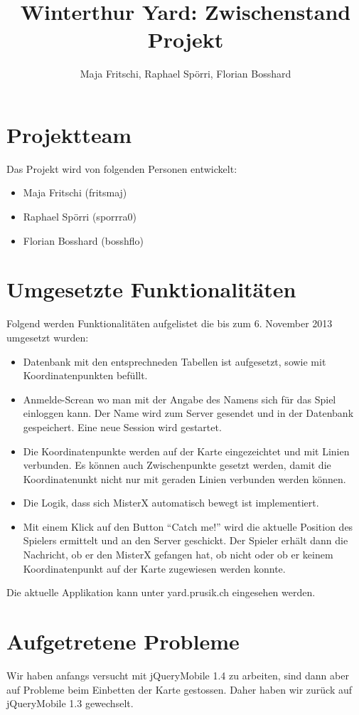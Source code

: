\documentclass[11pt]{article}
\title{Winterthur Yard: Zwischenstand Projekt}
\author{Maja Fritschi, Raphael Spörri, Florian Bosshard}
\date{}
\begin{document}
\maketitle

\tableofcontents
\newpage

\section{Projektteam}
Das Projekt wird von folgenden Personen entwickelt:
\begin{itemize}
\item Maja Fritschi (fritsmaj)
\item Raphael Spörri (sporrra0)
\item Florian Bosshard (bosshflo)
\end{itemize}


\section{Umgesetzte Funktionalitäten}
Folgend werden Funktionalitäten aufgelistet die bis zum 6. November 2013 umgesetzt wurden: 
\begin{itemize}
\item Datenbank mit den entsprechneden Tabellen ist aufgesetzt, sowie mit Koordinatenpunkten befüllt.
\item Anmelde-Screan wo man mit der Angabe des Namens sich für das Spiel einloggen kann. Der Name wird zum Server gesendet und in der Datenbank gespeichert. Eine neue Session wird gestartet.
\item Die Koordinatenpunkte werden auf der Karte eingezeichtet und mit Linien verbunden. Es können auch Zwischenpunkte gesetzt werden, damit die Koordinatenunkt nicht nur mit geraden Linien verbunden werden können.
\item Die Logik, dass sich MisterX automatisch bewegt ist implementiert.
\item Mit einem Klick auf den Button ``Catch me!'' wird die aktuelle Position des Spielers ermittelt und an den Server geschickt. Der Spieler erhält dann die Nachricht, ob er den MisterX gefangen hat, ob nicht oder ob er keinem Koordinatenpunkt auf der Karte zugewiesen werden konnte.
\end{itemize}

Die aktuelle Applikation kann unter yard.prusik.ch eingesehen werden. 

\section{Aufgetretene Probleme}
Wir haben anfangs versucht mit jQueryMobile 1.4 zu arbeiten, sind dann aber auf Probleme beim Einbetten der Karte gestossen. Daher haben wir zurück auf jQueryMobile 1.3 gewechselt.
\end{document}
